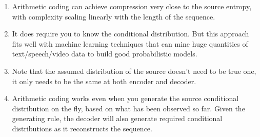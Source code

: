\documentclass[24pt]{article}
\begin{document}
\begin{enumerate}
\item Arithmetic coding can achieve compression very close to the source entropy, with complexity scaling linearly with the length of the sequence.
\item It does require you to know the conditional distribution. But this approach fits well with machine learning techniques that can mine huge quantities of text/speech/video data to build good probabilistic models.
\item Note that the assumed distribution of the source doesn't need to be true one, it only needs to be the same at both encoder and decoder.
\item Arithmetic coding works even when you generate the source conditional distribution on the fly, based on what has been observed so far. Given the generating rule, the decoder will also generate required conditional distributions as it reconstructs the sequence.
\end{enumerate}
\end{document}
